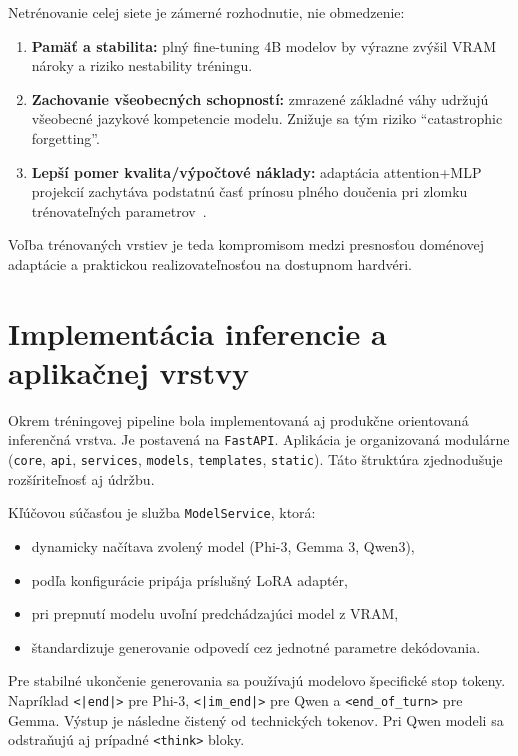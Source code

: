 Netrénovanie celej siete je zámerné rozhodnutie, nie obmedzenie:
\begin{enumerate}
    \item \textbf{Pamäť a stabilita:} plný fine-tuning 4B modelov by výrazne zvýšil VRAM nároky a riziko nestability tréningu.
    \item \textbf{Zachovanie všeobecných schopností:} zmrazené základné váhy udržujú všeobecné jazykové kompetencie modelu. Znižuje sa tým riziko \enquote{catastrophic forgetting}.
    \item \textbf{Lepší pomer kvalita/výpočtové náklady:} adaptácia attention+MLP projekcií zachytáva podstatnú časť prínosu plného doučenia pri zlomku trénovateľných parametrov~\cite{Hu2021LoRA,Dettmers2023QLoRA}.
\end{enumerate}

Voľba trénovaných vrstiev je teda kompromisom medzi presnosťou doménovej adaptácie a praktickou realizovateľnosťou na dostupnom hardvéri.

\section{Implementácia inferencie a aplikačnej vrstvy}

Okrem tréningovej pipeline bola implementovaná aj produkčne orientovaná inferenčná vrstva. Je postavená na \texttt{FastAPI}. Aplikácia je organizovaná modulárne (\texttt{core}, \texttt{api}, \texttt{services}, \texttt{models}, \texttt{templates}, \texttt{static}). Táto štruktúra zjednodušuje rozšíriteľnosť aj údržbu.

Kľúčovou súčasťou je služba \texttt{ModelService}, ktorá:
\begin{itemize}
    \item dynamicky načítava zvolený model (Phi-3, Gemma 3, Qwen3),
    \item podľa konfigurácie pripája príslušný LoRA adaptér,
    \item pri prepnutí modelu uvoľní predchádzajúci model z VRAM,
    \item štandardizuje generovanie odpovedí cez jednotné parametre dekódovania.
\end{itemize}

Pre stabilné ukončenie generovania sa používajú modelovo špecifické stop tokeny. Napríklad \texttt{<|end|>} pre Phi-3, \texttt{<|im\_end|>} pre Qwen a \texttt{<end\_of\_turn>} pre Gemma. Výstup je následne čistený od technických tokenov. Pri Qwen modeli sa odstraňujú aj prípadné \texttt{<think>} bloky.

